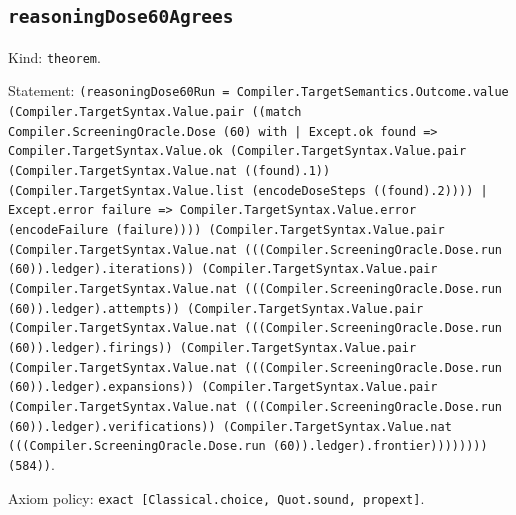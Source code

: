 \documentclass[11pt]{article}
\begin{document}
\subsection*{\texttt{reasoningDose60Agrees}}
\noindent Kind: \texttt{theorem}.\par
\noindent Statement: \texttt{(reasoningDose60Run = Compiler.TargetSemantics.Outcome.value (Compiler.TargetSyntax.Value.pair ((match Compiler.ScreeningOracle.Dose (60) with | Except.ok found => Compiler.TargetSyntax.Value.ok (Compiler.TargetSyntax.Value.pair (Compiler.TargetSyntax.Value.nat ((found).1)) (Compiler.TargetSyntax.Value.list (encodeDoseSteps ((found).2)))) | Except.error failure => Compiler.TargetSyntax.Value.error (encodeFailure (failure)))) (Compiler.TargetSyntax.Value.pair (Compiler.TargetSyntax.Value.nat (((Compiler.ScreeningOracle.Dose.run (60)).ledger).iterations)) (Compiler.TargetSyntax.Value.pair (Compiler.TargetSyntax.Value.nat (((Compiler.ScreeningOracle.Dose.run (60)).ledger).attempts)) (Compiler.TargetSyntax.Value.pair (Compiler.TargetSyntax.Value.nat (((Compiler.ScreeningOracle.Dose.run (60)).ledger).firings)) (Compiler.TargetSyntax.Value.pair (Compiler.TargetSyntax.Value.nat (((Compiler.ScreeningOracle.Dose.run (60)).ledger).expansions)) (Compiler.TargetSyntax.Value.pair (Compiler.TargetSyntax.Value.nat (((Compiler.ScreeningOracle.Dose.run (60)).ledger).verifications)) (Compiler.TargetSyntax.Value.nat (((Compiler.ScreeningOracle.Dose.run (60)).ledger).frontier)))))))) (584))}.\par
\noindent Axiom policy: \texttt{exact [Classical.choice, Quot.sound, propext]}.\par
\end{document}

